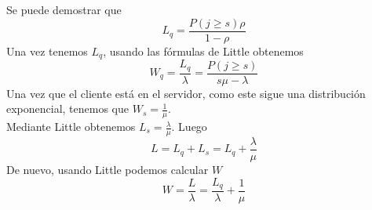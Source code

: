		Se puede demostrar que 
		$$L_q=\frac{P(j\geq s)\rho}{1-\rho}$$
		Una vez tenemos $L_q$, usando las f\'ormulas de Little obtenemos
		$$W_q=\frac{L_q}{\lambda}=\frac{P(j\geq s)}{s\mu-\lambda}$$
		\hspace{0.5cm} Una vez que el cliente est\'a en el servidor, como este sigue una distribuci\'on exponencial, tenemos que $W_s=\frac{1}{\mu}$.\\
	    \hspace{0.5cm}	Mediante Little obtenemos $L_s=\frac{\lambda}{\mu}$. Luego
		$$L=L_q+L_s=L_q+\frac{\lambda}{\mu}$$
		De nuevo, usando Little podemos calcular $W$
		$$W=\frac{L}{\lambda}=\frac{L_q}{\lambda}+\frac{1}{\mu}$$
		
		
		
	